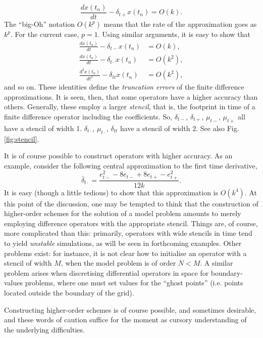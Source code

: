 \documentclass[11pt,twoside,a4paper,english]{book}
\newcommand{\etp}{e_{t+}}
\newcommand{\etm}{e_{t-}}
\newcommand{\dtp}{\delta_{t+}}
\newcommand{\dtm}{\delta_{t-}}
\newcommand{\dtd}{\delta_{t\cdot}}
\newcommand{\dtt}{\delta_{tt}}
\newcommand{\mtp}{\mu_{t+}}
\newcommand{\mtm}{\mu_{t-}}
\newcommand{\mtd}{\mu_{t\cdot}}
\begin{document}
\begin{equation}\label{eq:Errs1}
    \frac{dx(t_n)}{dt} - \dtp x(t_n) = O(k).
\end{equation} 
The ``big-Oh'' notation $O(k^p)$ means that the rate of the approximation goes as $k^p$. For the current case, $p=1$. Using similar arguments, it is easy to show that
\begin{subequations}\label{eq:Errs}
\begin{align}
     \frac{dx(t_n)}{dt} - \dtm x(t_n) &= O(k), \\   
     \frac{dx(t_n)}{dt} - \dtd x(t_n) &= O(k^2),\\   
     \frac{d^2x(t_n)}{dt^2} - \dtt x(t_n) &= O(k^2),
\end{align}
\end{subequations}
and so on. These identities define the \emph{truncation errors} of the finite difference approximations. It is seen, then, that some operators have a higher accuracy than others. Generally, these employ a larger \emph{stencil}, that is, the footprint in time of a finite difference operator including the coefficients. So, $\dtm$, $\dtp$, $\mtm$, $\mtp$ all have a stencil of width 1. $\dtd$, $\mtd$, $\dtt$ have a stencil of width 2. See also Fig. \ref{fig:stencil}. 


It is of course possible to construct operators with  higher accuracy. As an example, consider the following central approximation to the first time derivative, 
\begin{equation}
    \bar \delta_{t\cdot} = \frac{\etm^2 - 8 \etm + 8\etp - \etp^2}{12k}.
\end{equation} 
It is easy (though a little tedious) to show that this approximation is $O(k^4)$. At this point of the discussion, one may be tempted to think that the construction of higher-order schemes for the solution of a model problem amounts to merely employing difference operators with the appropriate stencil. Things are, of course, more complicated than this: primarily, operators with wide stencils in time tend to yield \emph{unstable} simulations, as will be seen in forthcoming examples. Other problems exist: for instance, it is not clear how to initialise an operator  with a stencil of width $M$, when the model problem is of order $N < M$. A similar problem arises when discretising differential operators in space for boundary-values problems, where one must set values for the ``ghost points'' (i.e. points located outside the boundary of the grid). 

Constructing higher-order schemes is of course possible, and sometimes desirable, and these words of caution suffice for the moment as cursory understanding of the underlying difficulties. 
\end{document}
